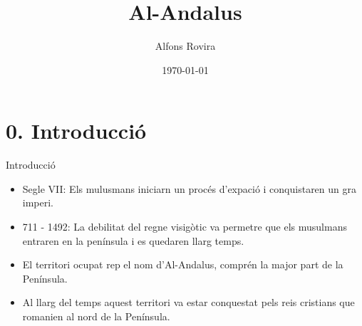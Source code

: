 \documentclass{beamer}
\title{Al-Andalus}
\date{\today}
\author{Alfons Rovira}
\institute{Alumnant IES Lluís Simarro, Xàtiva}
\begin{document}
  \maketitle
  \section{0. Introducció}
  \begin{frame}{Introducció}
  
     \begin{itemize}[<+-| alert@+>]
        \item Segle VII: Els mulusmans iniciarn un procés d'expació i conquistaren un gra imperi.
        \item 711 - 1492: La debilitat del regne visigòtic va permetre que els musulmans entraren en la península i es quedaren llarg temps.
        \item El territori ocupat rep el nom d'Al-Andalus, comprén la major part de la Península.
        \item Al llarg del temps aquest territori va estar conquestat pels reis cristians que romanien al nord de la Península.
     \end{itemize}
  \end{frame}
\end{document}
